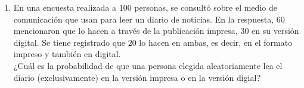 \documentclass{article}
\begin{document}
\begin{enumerate}
\item En una encuesta realizada a $100$ personas, se consult\'o sobre el medio de comunicaci\'on que usan para leer un diario de noticias. En la respuesta, $60$ mencionaron que lo hacen a trav\'es de la publicaci\'on impresa, $30$ en su versi\'on digital. Se tiene registrado que $20$ lo hacen en ambas, es decir, en el formato impreso y tambi\'en en digital. \\  ¿Cu\'al es la probabilidad de que una persona elegida aleatoriamente lea el diario (exclusivamente) en la versi\'on impresa o en la versi\'on digial?
\end{enumerate}
\end{document}
